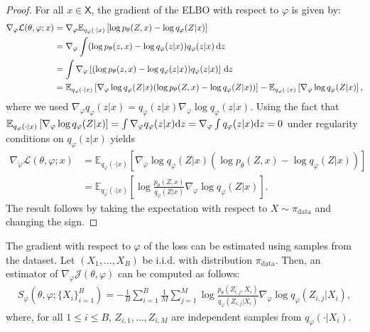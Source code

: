 \documentclass[english,graybox,envcountchap,envcountsame,sectrefs,shortlabels]{svmono}
\theoremstyle{style}
\newcommand{\eqsp}{}
\newcommand{\Xset}{\mathsf{X}}
\begin{document}
\begin{proof}
For all $x \in \Xset$, the gradient of the ELBO with respect to $\varphi$ is given by:
\begin{align*}
\nabla_{\varphi} \mathcal{L}(\theta, \varphi; x) &= \nabla_{\varphi} \mathbb{E}_{q_{\varphi}(\cdot|x)}\left[ \log p_{\theta}(Z,x) - \log q_{\varphi}(Z|x)\right] \\
&= \nabla_{\varphi} \int (\log p_{\theta}(z,x) - \log q_{\varphi}(z|x)) q_{\varphi}(z|x) \, \rmd z  \\
&= \int \nabla_{\varphi}\left[(\log p_{\theta}(z,x) - \log q_{\varphi}(z|x)) q_{\varphi}(z|x)\right] \, \rmd z  \\
&= \mathbb{E}_{q_{\varphi}(\cdot|x)}\left[ \nabla_{\varphi} \log q_{\varphi}(Z|x) (\log p_{\theta}(Z,x) - \log q_{\varphi}(Z|x)) \right] - \mathbb{E}_{q_{\varphi}(\cdot|x)}\left[\nabla_{\varphi} \log q_{\varphi}(Z|x)\right]\eqsp,
\end{align*}
where we used $\nabla_\varphi q_\varphi(z|x) = q_\varphi(z|x)\nabla_\varphi\log q_\varphi(z|x)$.
Using the fact that $\mathbb{E}_{q_{\varphi}(\cdot|x)}\left[\nabla_{\varphi} \log q_{\varphi}(Z|x)\right]=\int\nabla_\varphi q_\varphi(z|x)\mathrm{d} z = \nabla_\varphi\int q_\varphi(z|x)\mathrm{d} z = 0$ under regularity conditions on $q_{\varphi}(z|x)$ yields
\begin{align*}
\nabla_{\varphi} \mathcal{L}(\theta, \varphi; x) &= \mathbb{E}_{q_{\varphi}(\cdot|x)}\left[ \nabla_{\varphi} \log q_{\varphi}(Z|x) (\log p_{\theta}(Z,x) - \log q_{\varphi}(Z|x)) \right] \\
&= \mathbb{E}_{q_{\varphi}(\cdot|x)}\left[ \log \frac{p_{\theta}(Z,x)}{q_{\varphi}(Z|x)} \nabla_{\varphi} \log q_{\varphi}(Z|x) \right]\eqsp.
\end{align*}
The result follows by taking the expectation with respect to $X\sim\pi_{\mathrm{data}}$ and changing the sign.
\end{proof}
The gradient with respect to $\varphi$ of the loss can be estimated using samples from the dataset. Let $(X_1,\ldots,X_B)$ be i.i.d. with distribution $\pi_{\mathrm{data}}$. Then, an estimator of $\nabla_{\varphi} \mathcal{J}(\theta, \varphi)$ can be computed as follows:
\begin{align} \label{eq:grad_estimator_score_phi}
S_{\varphi}(\theta, \varphi; \{X_i\}_{i=1}^B) = -\frac{1}{B} \sum_{i=1}^{B} \frac{1}{M} \sum_{j=1}^{M} \log \frac{p_{\theta}(Z_{i,j},X_i)}{q_{\varphi}(Z_{i,j} | X_i)} \nabla_{\varphi} \log q_{\varphi}(Z_{i,j} | X_i)\eqsp,
\end{align}
where, for all $1 \leq i \leq B$,  $Z_{i,1},\ldots, Z_{i,M}$ are independent samples from $q_{\varphi}(\cdot|X_i)$.
\end{document}
